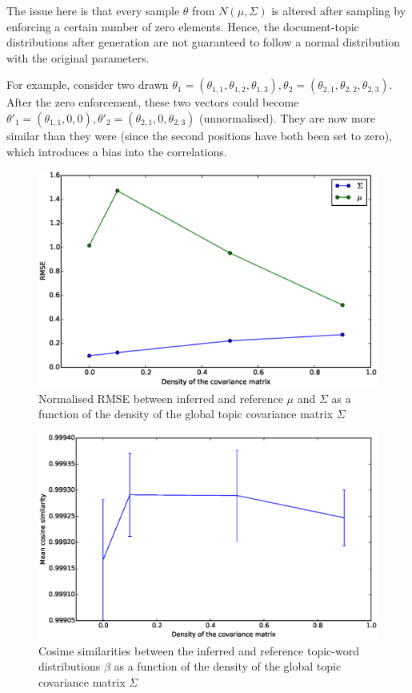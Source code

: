 \documentclass[12pt,a4paper,twoside,openright]{report}
\begin{document}
The issue here is that every sample $\theta$ from $N(\mu, \Sigma)$ is altered after sampling by enforcing a certain number of zero elements. Hence, the document-topic distributions after generation are not guaranteed to follow a normal distribution with the original parameters.

For example, consider two drawn $\theta_1 = (\theta_{1,1}, \theta_{1,2}, \theta_{1,3}), \theta_2 = (\theta_{2,1}, \theta_{2,2}, \theta_{2,3})$. After the zero enforcement, these two vectors could become $\theta'_1 = (\theta_{1,1}, 0, 0), \theta'_2 = (\theta_{2,1}, 0, \theta_{2,3})$ (unnormalised). They are now more similar than they were (since the second positions have both been set to zero), which introduces a bias into the correlations.

\begin{figure}[!htb]
\includegraphics[width=\textwidth]{sim-sigmadensity-musigma.eps}
\caption{Normalised RMSE between inferred and reference $\mu$ and $\Sigma$ as a function of the density of the global topic covariance matrix $\Sigma$}
\label{fig:sim-sigmadensity-musigma}
\end{figure}

\begin{figure}[!htb]
\includegraphics[width=\textwidth]{sim-sigmadensity-beta.eps}
\caption{Cosime similarities between the inferred and reference topic-word distributions $\beta$ as a function of the density of the global topic covariance matrix $\Sigma$}
\label{fig:sim-sigmadensity-beta}
\end{figure}
\end{document}
